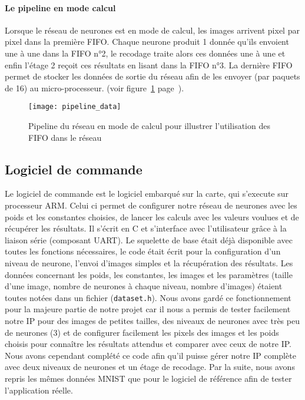 	\paragraph{Le pipeline en mode calcul}
	Lorsque le réseau de neurones est en mode de calcul, les images arrivent pixel par pixel dans la première FIFO. 
	Chaque neurone produit 1 donnée qu'ils envoient une à une dans la FIFO n°2, le recodage traite alors ces 
	données une à une et enfin l'étage 2 reçoit ces résultats en lisant dans la FIFO n°3. La dernière FIFO 
	permet de stocker les données de sortie du réseau afin de les envoyer (par paquets de 16) au micro-processeur. 
	(voir figure~\ref{fig:pipeline_data} page~\pageref{fig:pipeline_data}).
	\begin{figure}[h!]
		\texttt{[image: pipeline\_data]}
		\caption{Pipeline du réseau en mode de calcul pour illustrer l'utilisation des FIFO dans le réseau}
		\label{fig:pipeline_data}
	\end{figure}

\subsection{Logiciel de commande}
Le logiciel de commande est le logiciel embarqué sur la carte, qui s'execute
sur processeur ARM. Celui ci permet de configurer notre réseau de neurones avec
les poids et les constantes choisies, de lancer les calculs avec les valeurs
voulues et de récupérer les résultats. Il s'écrit en C et s'interface avec
l'utilisateur grâce à la liaison série (composant UART). Le squelette de base
était déjà disponible avec toutes les fonctions nécessaires, le code était
écrit pour la configuration d'un niveau de neurone, l'envoi d'images simples et
la récupération des résultats. Les données
concernant les poids, les constantes, les images et les paramètres (taille d'une
image, nombre de neurones à chaque niveau, nombre d'images) étaient toutes notées
dans un fichier (\texttt{dataset.h}). Nous avons gardé ce fonctionnement pour la
majeure partie de notre projet car il nous a permis de tester facilement notre
IP pour des images de petites tailles, des niveaux de neurones avec très peu
de neurones (3) et de configurer facilement les pixels des images et les poids
choisis pour connaître les résultats attendus et comparer avec ceux de notre IP.
Nous avons cependant complété ce code afin qu'il puisse gérer notre IP complète
avec deux niveaux de neurones et un étage de recodage.
Par la suite, nous avons repris les mêmes données MNIST que pour le logiciel de
référence afin de tester l'application réelle. \\

